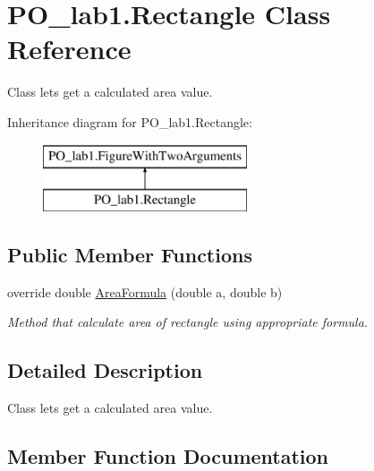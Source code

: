\hypertarget{class_p_o__lab1_1_1_rectangle}{}\section{P\+O\+\_\+lab1.\+Rectangle Class Reference}
\label{class_p_o__lab1_1_1_rectangle}


Class lets get a calculated area value.  


Inheritance diagram for P\+O\+\_\+lab1.\+Rectangle\+:\begin{figure}[H]
\begin{center}
\leavevmode
\includegraphics[height=2.000000cm]{class_p_o__lab1_1_1_rectangle}
\end{center}
\end{figure}
\subsection*{Public Member Functions}
\begin{DoxyCompactItemize}
\item 
override double \mbox{\hyperlink{class_p_o__lab1_1_1_rectangle_a14f4a197dc43f0b6ea2063f87a89e451}{Area\+Formula}} (double a, double b)
\begin{DoxyCompactList}\small\item\em Method that calculate area of rectangle using appropriate formula. \end{DoxyCompactList}\end{DoxyCompactItemize}


\subsection{Detailed Description}
Class lets get a calculated area value. 



\subsection{Member Function Documentation}
\mbox{\label{class_p_o__lab1_1_1_rectangle_a14f4a197dc43f0b6ea2063f87a89e451}} 
